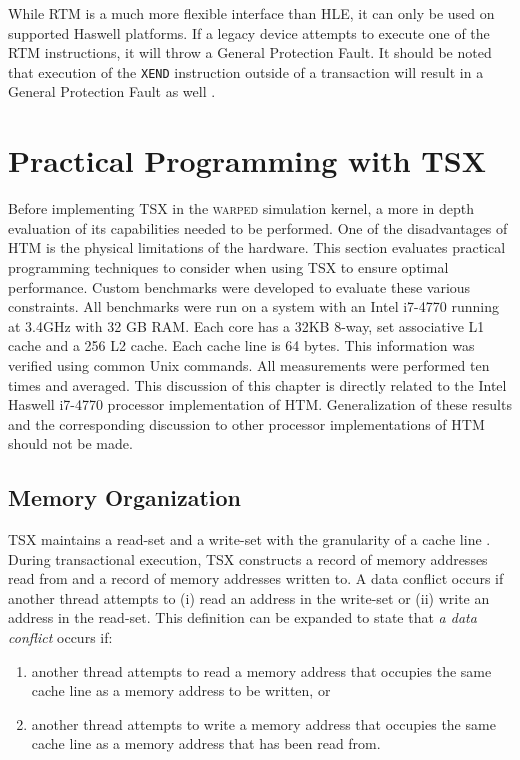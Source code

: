 \documentclass[11pt]{book}
\begin{document}
While RTM is a much more flexible interface than HLE, it can only be used on supported
Haswell platforms.  If a legacy device attempts to execute one of the RTM instructions, it
will throw a General Protection Fault.  It should be noted that execution of the
\texttt{XEND} instruction outside of a transaction will result in a General Protection
Fault as well \cite{intel_opt_man}.

\chapter{Practical Programming with TSX}

Before implementing TSX in the \textsc{warped} simulation kernel, a more in depth
evaluation of its capabilities needed to be performed.  One of the disadvantages of HTM is
the physical limitations of the hardware.  This section evaluates practical programming
techniques to consider when using TSX to ensure optimal performance.  Custom benchmarks
were developed to evaluate these various constraints.  All benchmarks were run on a system
with an Intel i7-4770 running at 3.4GHz with 32 GB RAM.  Each core has a 32KB 8-way, set
associative L1 cache and a 256 L2 cache.  Each cache line is 64 bytes.  This information
was verified using common Unix commands.  All measurements were performed ten times and
averaged.  This discussion of this chapter is directly related to the Intel Haswell
i7-4770 processor implementation of HTM.  Generalization of these results and the
corresponding discussion to other processor implementations of HTM should not be made. 

\section{Memory Organization}

TSX maintains a read-set and a write-set with the granularity of a cache line
\cite{intel_prog_ref}.  During transactional execution, TSX constructs a record of memory
addresses read from and a record of memory addresses written to.  A data conflict occurs
if another thread attempts to (i) read an address in the write-set or (ii) write an
address in the read-set.  This definition can be expanded to state that \emph{a data
  conflict} occurs if:

\vspace*{-\bigskipamount}
\begin{singlespace}
\begin{enumerate}
  \item another thread attempts to read a memory address that occupies the same cache line
    as a memory address to be written, or
  \item another thread attempts to write a memory address that occupies the same cache
    line as a memory address that has been read from.
\end{enumerate}
\end{singlespace}
\end{document}
